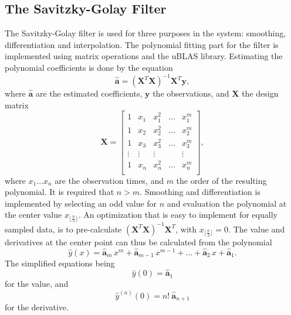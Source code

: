 \subsection{The Savitzky-Golay Filter}

The Savitzky-Golay filter is used for three purposes in the system:
smoothing, differentiation and interpolation.
The polynomial fitting part for the filter is implemented using
matrix operations and the uBLAS library.
Estimating the polynomial coefficients is done by the equation
\begin{equation}
\label{eq:sg_coefs}
\widehat{\mathbf{a}} = \left( \mathbf{X}^T \mathbf{X} \right)^{-1} \mathbf{X}^T \mathbf{y},
\end{equation}
where $\widehat{\mathbf{a}}$ are the estimated coefficients,
$\mathbf{y}$ the observations,
and $\mathbf{X}$ the design matrix
\begin{equation}
\label{eq:sg_design_matrix}
\mathbf{X} = \left[
\begin{array}{ccccc}
1 & x_1 & x_1^2 & \ldots & x_1^m \\
1 & x_2 & x_2^2 & \ldots & x_2^m \\
1 & x_3 & x_3^2 & \ldots & x_3^m \\
\vdots & \vdots & \vdots & & \vdots \\
1 & x_n & x_n^2 & \ldots & x_n^m \\
\end{array}
\right] ,
\end{equation}
where $x_1 \ldots x_n$ are the observation times,
and $m$ the order of the resulting polynomial.
It is required that $n > m$.
Smoothing and differentiation is implemented by
selecting an odd value for $n$
and evaluation the polynomial at the center value
$x_{\lfloor \frac{n}{2} \rfloor}$.
An optimization that is easy to implement for equally sampled data,
is to pre-calculate $\left( \mathbf{X}^T \mathbf{X} \right)^{-1} \mathbf{X}^T$,
with $x_{\lfloor \frac{n}{2} \rfloor} = 0$.
The value and derivatives at the center point
can thus be calculated from the polynomial
\begin{equation}
\widehat{y}(x) =
\widehat{\mathbf{a}}_m \, x^m +
\widehat{\mathbf{a}}_{m-1} \, x^{m-1} +
\ldots +
\widehat{\mathbf{a}}_{2} \, x +
\widehat{\mathbf{a}}_{1}.
\end{equation}
The simplified equations being
\begin{equation}
\widehat{y}(0) = \widehat{\mathbf{a}}_{1}
\end{equation}
for the value, and
\begin{equation}
\widehat{y}^{(n)}(0) = n! \: \widehat{\mathbf{a}}_{n + 1}
\end{equation}
for the \nth derivative.

